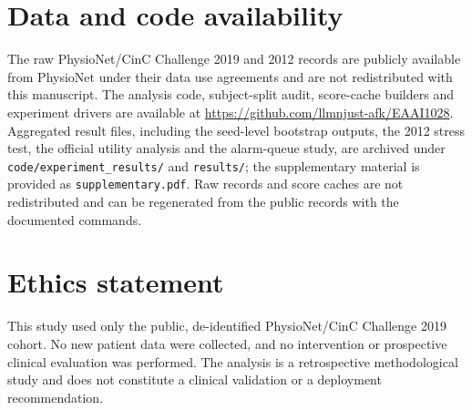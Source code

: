 \section*{Data and code availability}
The raw PhysioNet/CinC Challenge 2019 and 2012 records are publicly available from PhysioNet under their data use agreements and are not redistributed with this manuscript. The analysis code, subject-split audit, score-cache builders and experiment drivers are available at \url{https://github.com/llmnjust-afk/EAAI1028}. Aggregated result files, including the seed-level bootstrap outputs, the 2012 stress test, the official utility analysis and the alarm-queue study, are archived under \texttt{code/experiment\_results/} and \texttt{results/}; the supplementary material is provided as \texttt{supplementary.pdf}. Raw records and score caches are not redistributed and can be regenerated from the public records with the documented commands.

\section*{Ethics statement}
This study used only the public, de-identified PhysioNet/CinC Challenge 2019 cohort. No new patient data were collected, and no intervention or prospective clinical evaluation was performed. The analysis is a retrospective methodological study and does not constitute a clinical validation or a deployment recommendation.
